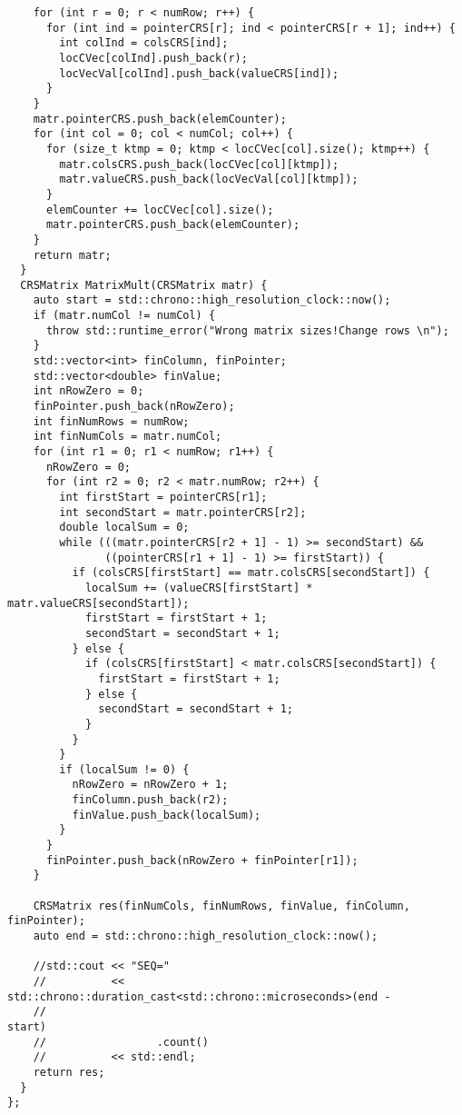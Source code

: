 \documentclass[14pt, russian]{extarticle}
\begin{document}
\begin{lstlisting}
    for (int r = 0; r < numRow; r++) {
      for (int ind = pointerCRS[r]; ind < pointerCRS[r + 1]; ind++) {
        int colInd = colsCRS[ind];
        locCVec[colInd].push_back(r);
        locVecVal[colInd].push_back(valueCRS[ind]);
      }
    }
    matr.pointerCRS.push_back(elemCounter);
    for (int col = 0; col < numCol; col++) {
      for (size_t ktmp = 0; ktmp < locCVec[col].size(); ktmp++) {
        matr.colsCRS.push_back(locCVec[col][ktmp]);
        matr.valueCRS.push_back(locVecVal[col][ktmp]);
      }
      elemCounter += locCVec[col].size();
      matr.pointerCRS.push_back(elemCounter);
    }
    return matr;
  }
  CRSMatrix MatrixMult(CRSMatrix matr) {
    auto start = std::chrono::high_resolution_clock::now();
    if (matr.numCol != numCol) {
      throw std::runtime_error("Wrong matrix sizes!Change rows \n");
    }
    std::vector<int> finColumn, finPointer;
    std::vector<double> finValue;
    int nRowZero = 0;
    finPointer.push_back(nRowZero);
    int finNumRows = numRow;
    int finNumCols = matr.numCol;
    for (int r1 = 0; r1 < numRow; r1++) {
      nRowZero = 0;
      for (int r2 = 0; r2 < matr.numRow; r2++) {
        int firstStart = pointerCRS[r1];
        int secondStart = matr.pointerCRS[r2];
        double localSum = 0;
        while (((matr.pointerCRS[r2 + 1] - 1) >= secondStart) &&
               ((pointerCRS[r1 + 1] - 1) >= firstStart)) {
          if (colsCRS[firstStart] == matr.colsCRS[secondStart]) {
            localSum += (valueCRS[firstStart] * matr.valueCRS[secondStart]);
            firstStart = firstStart + 1;
            secondStart = secondStart + 1;
          } else {
            if (colsCRS[firstStart] < matr.colsCRS[secondStart]) {
              firstStart = firstStart + 1;
            } else {
              secondStart = secondStart + 1;
            }
          }
        }
        if (localSum != 0) {
          nRowZero = nRowZero + 1;
          finColumn.push_back(r2);
          finValue.push_back(localSum);
        }
      }
      finPointer.push_back(nRowZero + finPointer[r1]);
    }

    CRSMatrix res(finNumCols, finNumRows, finValue, finColumn, finPointer);
    auto end = std::chrono::high_resolution_clock::now();

    //std::cout << "SEQ="
    //          << std::chrono::duration_cast<std::chrono::microseconds>(end -
    //                                                                   start)
    //                 .count()
    //          << std::endl;
    return res;
  }
};


\end{lstlisting}
\end{document}
